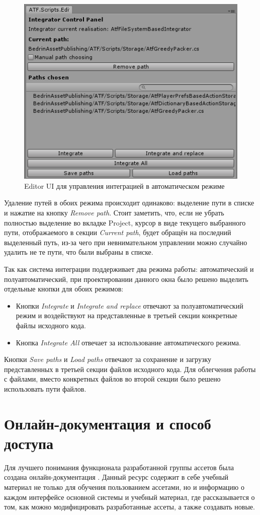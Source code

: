 \begin{figure}[h]
	\centering
	\includegraphics[width=0.7\linewidth]{integrator_automatic.PNG}
	\caption{Editor UI для управления интеграцией в автоматическом режиме}
	\label{integratorUIAutomatic}
\end{figure}

Удаление путей в обоих режима происходит одинаково: выделение пути в списке и нажатие на кнопку \textit{Remove path}. Стоит заметить, что, если не убрать полностью выделение во вкладке Project, курсор в виде текущего выбранного пути, отображаемого в секции \textit{Current path}, будет обращён на последний выделенный путь, из-за чего при невнимательном управлении можно случайно удалить не те пути, что были выбраны в списке.

Так как система интеграции поддерживает два режима работы: автоматический и полуавтоматический, при проектировании данного окна было решено выделить отдельные кнопки для обоих режимов:
\begin{itemize}
	\item
	Кнопки \textit{Integrate} и \textit{Integrate and replace} отвечают за полуавтоматический режим и воздействуют на представленные в третьей секции конкретные файлы исходного кода.
	\item
	Кнопка \textit{Integrate All} отвечает за использование автоматического режима.
\end{itemize}

Кнопки \textit{Save paths} и \textit{Load paths} отвечают за сохранение и загрузку представленных в третьей секции файлов исходного кода. Для облегчения работы с файлами, вместо конкретных файлов во второй секции было решено использовать пути файлов.

\section{Онлайн-документация и способ доступа}
Для лучшего понимания функционала разработанной группы ассетов была создана онлайн-документация \cite{atf_docs}. Данный ресурс содержит в себе учебный материал не только для обучения пользованием ассетами, но и информацию о каждом интерфейсе основной системы и учебный материал, где рассказывается о том, как можно модифицировать разработанные ассеты, а также создавать новые. 

